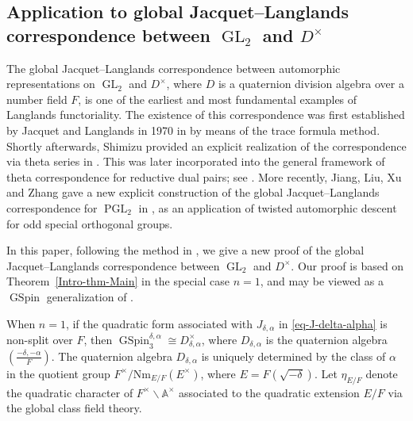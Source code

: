 \documentclass[12pt]{amsart}
\newcommand{\PGL}{\operatorname{PGL}}
\newcommand{\A}{\mathbb{A}}
\theoremstyle{remark}
\DeclareMathOperator{\GL}{GL}
\DeclareMathOperator{\GSpin}{GSpin}
\begin{document}
\subsection{Application to global Jacquet--Langlands correspondence between $\GL_2$ and $D^\times$}
\label{subsection-Intro-application-JacquetLanglands}
The global Jacquet--Langlands correspondence between automorphic representations on $\GL_2$ and $D^\times$, where $D$ is a quaternion division algebra over a number field $F$, is one of the earliest and most fundamental examples of Langlands functoriality. The existence of this correspondence was first established by Jacquet and Langlands in 1970 in \cite{JacquetLanglands1970} by means of the trace formula method. Shortly afterwards, Shimizu provided an explicit realization of the correspondence via theta series in \cite{Shimizu1972}. This was later incorporated into the general framework of theta correspondence for reductive dual pairs; see \cite{Howe1979}. More recently, Jiang, Liu, Xu and Zhang gave a new explicit construction of the global Jacquet--Langlands correspondence for $\PGL_2$ in \cite{JiangLiuXuZhang2016}, as an application of twisted automorphic descent for odd special orthogonal groups.

In this paper, following the method in \cite{JiangLiuXuZhang2016}, we give a new proof of the global Jacquet--Langlands correspondence between $\GL_2$ and $D^\times$. Our proof is based on Theorem~\ref{Intro-thm-Main} in the special case $n=1$, and may be viewed as a $\GSpin$ generalization of \cite{JiangLiuXuZhang2016}.

When $n=1$, if the quadratic form associated with $J_{\delta,\alpha}$ in \eqref{eq-J-delta-alpha} is non-split over $F$, then $\GSpin_{3}^{\delta,\alpha}\cong D_{\delta,\alpha}^\times$, where $D_{\delta,\alpha}$ is the quaternion algebra $\left( \frac{-\delta,-\alpha}{F}\right)$. 
The quaternion algebra $D_{\delta,\alpha}$ is uniquely determined by the class of $\alpha$ in the quotient group $F^\times/ \mathrm{Nm}_{E/F} (E^\times)$, where $E=F(\sqrt{-\delta})$. Let $\eta_{E/F}$ denote the quadratic character of $F^\times\backslash \A^\times$ associated to the quadratic extension $E/F$ via the global class field theory.
 
\end{document}
